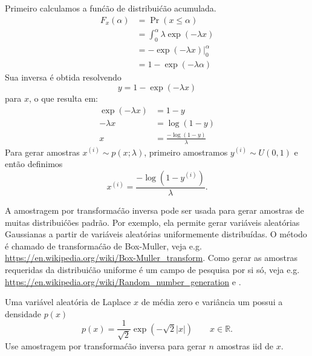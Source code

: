 \begin{solution}
    Primeiro calculamos a fun\'c\~ao de distribui\'c\~ao acumulada.
    \begin{align}
        F_x(\alpha) & = \Pr(x\le \alpha)\\
        & = \int_0^\alpha  \lambda \exp(-\lambda x)\\
        & = -\exp(-\lambda x)\big|_0^\alpha\\
        & = 1-\exp(-\lambda \alpha)
    \end{align}
    Sua inversa \'e obtida resolvendo
    \begin{equation}
        y = 1-\exp(-\lambda x)
    \end{equation}
    para $x$, o que resulta em:
    \begin{align}
        \exp(-\lambda x) &= 1-y\\
        -\lambda x &= \log(1-y)\\
        x &= \frac{-\log(1-y)}{\lambda}
    \end{align}
    Para gerar amostras $x^{(i)}  \sim p(x; \lambda)$, primeiro amostramos $y^{(i)} \sim U(0,1)$ e ent\~ao definimos
    \begin{equation}
        x^{(i)} = \frac{-\log(1-y^{(i)})}{\lambda}.
    \end{equation}
    
    A amostragem por transforma\'c\~ao inversa pode ser usada para gerar amostras
    de muitas distribui\'c\~oes padrão. Por exemplo, ela permite gerar
    vari\'aveis aleat\'orias Gaussianas a partir de vari\'aveis aleat\'orias uniformemente
    distribu\'idas. O m\'etodo \'e chamado de transforma\'c\~ao de Box-Muller, veja
    e.g. \url{https://en.wikipedia.org/wiki/Box-Muller_transform}. Como
    gerar as amostras requeridas da distribui\'c\~ao uniforme \'e um campo de
    pesquisa por si s\'o, veja
    e.g. \url{https://en.wikipedia.org/wiki/Random_number_generation}
    e \citep[Cap\'itulo 3]{Owen2013}.
    
\end{solution}


\label{ex:sampling-from-a-Laplace-distribution}
Uma vari\'avel aleat\'oria de Laplace $x$ de m\'edia zero e vari\^ancia um possui a densidade $p(x)$
\begin{equation}
    p(x) = \frac{1}{\sqrt{2}} \exp\left(-\sqrt{2}|x|\right) \quad \quad x \in \mathbb{R}.  
\end{equation}
Use amostragem por transforma\'c\~ao inversa para gerar $n$ amostras iid de $x$.

